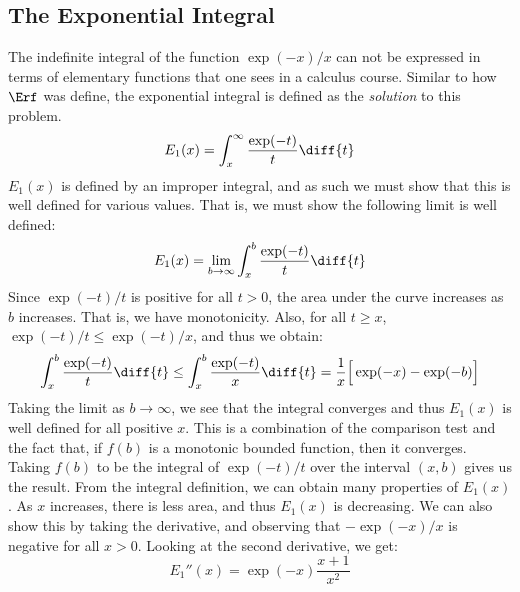 \documentclass[crop=false,class=book,oneside]{standalone}
\begin{document}
        \subsection{The Exponential Integral}
            The indefinite integral of the function
            $\exp(-x)/x$ can not be expressed in terms of
            elementary functions that one sees in a calculus course.
            Similar to how $\Erf$ was define, the exponential
            integral is defined as the \textit{solution} to this
            problem.
            \begin{equation}
                E_{1}(x)=\int_{x}^{\infty}\frac{\exp(-t)}{t}\diff{t}
            \end{equation}
            $E_{1}(x)$ is defined by an improper integral, and
            as such we must show that this is well defined for
            various values. That is, we must show the following
            limit is well defined:
            \begin{equation}
                E_{1}(x)=\underset{b\rightarrow\infty}{\lim}
                \int_{x}^{b}\frac{\exp(-t)}{t}\diff{t}
            \end{equation}
            Since $\exp(-t)/t$ is positive for all
            $t>0$, the area under the curve increases as $b$
            increases. That is, we have monotonicity. Also, for
            all $t\geq{x}$, $\exp(-t)/t\leq\exp(-t)/x$, and thus
            we obtain:
            \begin{equation}
                \int_{x}^{b}\frac{\exp(-t)}{t}\diff{t}
                \leq\int_{x}^{b}\frac{\exp(-t)}{x}\diff{t}
                =\frac{1}{x}\Big[\exp(-x)-\exp(-b)\Big]
            \end{equation}
            Taking the limit as $b\rightarrow\infty$, we see
            that the integral converges and thus $E_{1}(x)$ is
            well defined for all positive $x$. This is a combination
            of the comparison test and the fact that, if
            $f(b)$ is a monotonic bounded function, then it
            converges. Taking $f(b)$ to be the integral of
            $\exp(-t)/t$ over the interval $(x,b)$ gives us the
            result. From the integral definition, we can obtain
            many properties of $E_{1}(x)$. As $x$ increases, there
            is less area, and thus $E_{1}(x)$ is decreasing.
            We can also show this by taking the derivative, and
            observing that $-\exp(-x)/x$ is negative for all
            $x>0$. Looking at the second derivative, we get:
            \begin{equation}
                E_{1}''(x)=\exp(-x)\frac{x+1}{x^{2}}
            \end{equation}
\end{document}
